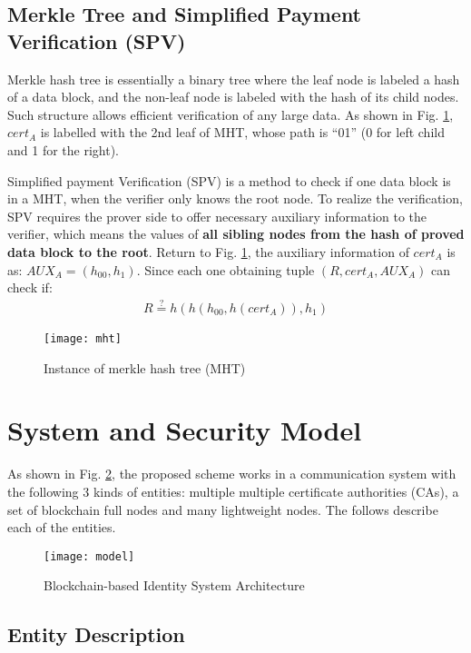 \documentclass[conference]{IEEEtran}
\begin{document}
\subsection{Merkle Tree and Simplified Payment Verification (SPV)}
\label{section:merkle}
Merkle hash tree \cite{merkle1987digital} is essentially a binary tree where the leaf node is labeled a hash of a data block, and the non-leaf node is labeled with the hash of its child nodes. Such structure allows efficient verification of any large data. As shown in Fig. \ref{fig:mht}, $cert_A$ is labelled with the 2nd leaf of MHT, whose path is ``01'' (0 for left child and 1 for the right).

Simplified payment Verification (SPV) is a method to check if one data block is in a MHT, when the verifier only knows the root node. To realize the verification, SPV requires the prover side to offer necessary auxiliary information to the verifier, which means the values of \textbf{all sibling nodes from the hash of proved data block to the root}.
Return to Fig. \ref{fig:mht}, the auxiliary information of $cert_A$ is as: $AUX_A = (h_{00}, h_{1})$. Since each one obtaining tuple $(R, cert_A, AUX_A)$ can check if:
\begin{align}\label{eq:aux}
R \overset{?}{=} h(h(h_{00}, h(cert_A)), h_1)
\end{align}

\begin{figure}[t]
	\centering
	\texttt{[image: mht]}
	\caption{Instance of merkle hash tree (MHT)}\label{fig:mht}
\end{figure}

\section{System and Security Model} \label{sec:model}
As shown in Fig. \ref{fig:model}, the proposed scheme works in a communication system with the following 3 kinds of entities: multiple multiple certificate authorities (CAs), a set of blockchain full nodes and many lightweight nodes. The follows describe each of the entities. 


\begin{figure}[t]
	\centering
	\texttt{[image: model]}
	\caption{Blockchain-based Identity System Architecture}\label{fig:model}
\end{figure}
\subsection{Entity Description}
\end{document}
